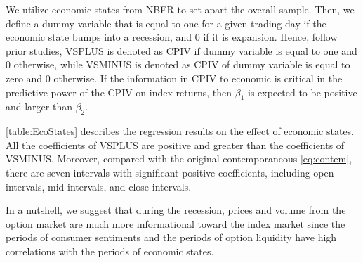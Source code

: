 We utilize economic states from NBER to set apart the overall sample. Then, we define a dummy variable that is equal to one for a given trading day if the economic state bumps into a recession, and 0 if it is expansion. Hence, follow prior studies, VSPLUS is denoted as CPIV if dummy variable is equal to one and 0 otherwise, while VSMINUS is denoted as CPIV of dummy variable is equal to zero and 0 otherwise. If the information in CPIV to economic is critical in the predictive power of the CPIV on index returns, then $\beta _{1}$ is expected to be positive and larger than $\beta _{2}$.

\autoref{table:EcoStates} describes the regression results on the effect of economic states. All the coefficients of VSPLUS are positive and greater than the coefficients of VSMINUS. Moreover, compared with the original contemporaneous \autoref{eq:contem}, there are seven intervals with significant positive coefficients, including open intervals, mid intervals, and close intervals. 

In a nutshell, we suggest that during the recession, prices and volume from the option market are much more informational toward the index market since the periods of consumer sentiments and the periods of option liquidity have high correlations with the periods of economic states.  















